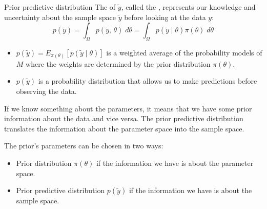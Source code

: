 \begin{definition}{Prior predictive distribution}{}
	The  of $\tilde{y}$, called the ,
	represents our knowledge and uncertainty about the sample space $\tilde{y}$ before looking at the data $y$:
	\begin{equation}
		p(\tilde y) = \int_{\Omega} p(\tilde y ,\, \theta) \;d\theta = \int_{\Omega} p(\tilde y \mid \theta) \pi(\theta) \;d\theta
	\end{equation}

    \tcblower
    \begin{note}
        \begin{itemize}
            \item $p(\tilde y) = E_{\pi(\theta)}[p(\tilde y \mid \theta)]$ is a weighted average of the
                  probability models of $M$ where the weights are determined by the prior distribution $\pi(\theta)$.
            \item $p(\tilde y)$ is a probability distribution that allows us to make predictions before
                  observing the data.
        \end{itemize}
    \end{note}
\end{definition}

If we know something about the parameters, it means that we have some prior information about the data
and vice versa. The prior predictive distribution translates the information about the
parameter space into the sample space.

The prior's parameters can be chosen in two ways:
\begin{itemize}
	\item Prior distribution $\pi(\theta)$ if the information we have is about the parameter space.
	\item Prior predictive distribution $p(\tilde y)$ if the information we have is about the sample space.
\end{itemize}

